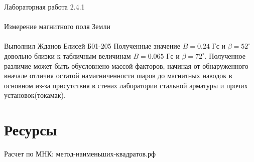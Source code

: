 \documentclass{astroedu-lab}
\begin{document}
\begin{problem}{\huge Лабораторная работа 2.4.1\\\\Измерение магнитного поля Земли\\\\Выполнил Жданов Елисей Б01-205}
Полученные значение $B = 0.24 \text{ Гс}$ и $\beta = 52^\circ$ довольно близки к табличным величинам $B = 0.065 \text{ Гс}$ и $\beta =72^\circ$. Полученное различие может быть обусловнено массой факторов, начиная от обнаруженного вначале отличия остатой намагниченности шаров до магнитных наводок в основном из-за присутствия в стенах лаборатории стальной арматуры и прочих установок(токамак). 

\section{Ресурсы}

Расчет по МНК: метод-наименьших-квадратов.рф

\end{problem}
\end{document}
